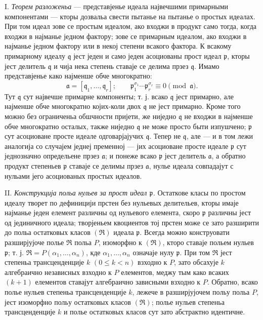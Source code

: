 ﻿\documentclass[11pt]{article}
\providecommand{\fraka}{\mathfrak a}
\providecommand{\frakp}{\mathfrak p}
\providecommand{\frakq}{\mathfrak q}
\providecommand{\frakR}{\mathfrak R}
\begin{document}
\noindent I. \emph{Теорем разложеньа} --- представјенье идеала највечшими примарными компонентами --- кторы дозвальа свести пытанье на пытанье о простых идеалах. При том идеал зове се простым идеалом, ако входжи в продукт само тогда, когда входжи в најманье једном фактору; зове се примарным идеалом, ако входжи в најманье једном фактору или в некој степени всакого фактора. К всакому примарному идеалу $\frakq$ јест једен и само једен асоциованы прост идеал $\frakp$, кторы јест делитель $\frakq$ и чија нека степень ставаје се делима прзез $\frakq$. Имамо представјенье како најменше обче многократно:
\[
 \fraka=[\frakq_1,\ldots,\frakq_r];\qquad
 \frakp_1^{\sigma_1}\cdots \frakp_r^{\sigma_r}\equiv 0\pmod{\fraka}.
\]
Тут $\frakq$ сут највечше примарне компоненты; т. ј. всако $\frakq$ јест примарно, але најменше обче многократно којих-коли двох $\frakq$ не јест примарно. Кроме того можно без ограниченьа обшчности пријети, же ниједно $\frakq$ не входжи в најменше обче многократно осталых, также ниједно $\frakq$ не може просто быти изпушчено; $\frakp$ сут асоциоване просте идеале одговарјајучих $\frakq$. Тепер не $\frakq$, але --- и в том лежи аналогија со случајем једнеј пременној --- јих асоциоване просте идеале $\frakp$ сут једнозначно определьене прзез $\fraka$; и понеже всако $\frakp$ јест делитель $\fraka$, а обратно продукт степеньев $\frakp$ ставаје се делимы прзез $\fraka$, нулье идеала совпадајут с нульами јего асоциованых простых идеалов.

\noindent II. \emph{Конструкција польа нульев за прост идеал $\frakp$.} Остаткове класы по простом идеалу творет по дефиницији прстен без нульевых делительев, кторы имаје најманье једен елемент различны од нульевого елемента, скоро $\frakp$ различны јест од јединичного идеала; творјеньем квоциентов тој прстен може се зато разширити до польа остатковых класов $(\frakR)$ идеала $\frakp$. Всегда можно конструовати разширјујоче полье $\frakR$ польа $P$, изоморфно к $(\frakR)$, кторо ставаје польем нульев $\frakp$; т. ј. $\frakR=P(\alpha_1,\ldots,\alpha_n)$, кде $\alpha_1,\ldots,\alpha_n$ означаје нулу $\frakp$. При том $\frakR$ јест степеньа трансценденције $k$ $(0\leq k<n)$ взходно к $P$, зато обсахује $k$ алгебраично независных взходно к $P$ елементов, меджу тым како всаких $(k+1)$ елементов ставајут алгебраично зависными взходно к $P$. Обратно, всако полье нульев степеньа трансценденције $k$, лежече в разширјујочем польу польа $P$, јест изоморфно польу остатковых класов $(\frakR)$; полье нульев степеньа трансценденције $k$ и полье остатковых класов сут зато абстрактно идентичне.
\end{document}
